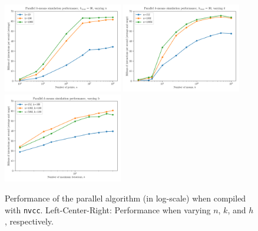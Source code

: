 \documentclass{article}
\begin{document}
	\begin{figure}[H]
		\begin{center}
			\includegraphics[width=5.2cm]{figures/perf_plot1_log.png}\quad
			\includegraphics[width=5.2cm]{figures/perf_plot2_log.png}\quad
			\includegraphics[width=5.2cm]{figures/perf_plot3_log.png}
		\end{center}
		\caption{Performance of the parallel algorithm (in log-scale) when compiled with \texttt{nvcc}. Left-Center-Right: Performance when varying $n$, $k$, and $h$, respectively.}
	\end{figure}
\end{document}
